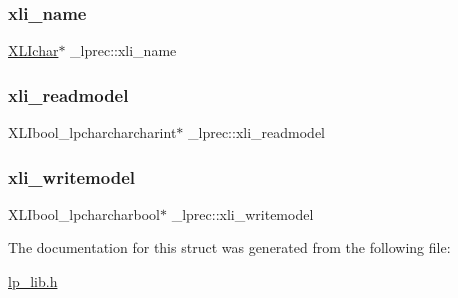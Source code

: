 \mbox{\label{struct__lprec_a9170c25246d72dd3fd3f78f52cd5b1cf}} 
\subsubsection{\texorpdfstring{xli\+\_\+name}{xli\_name}}
{\footnotesize\ttfamily \hyperlink{lp__lib_8h_a44d441822dca4210a8458ba33a1ef89b}{X\+L\+Ichar}$\ast$ \+\_\+lprec\+::xli\+\_\+name}

\mbox{\label{struct__lprec_a87003286e722237e20ef74188878ebf3}} 
\subsubsection{\texorpdfstring{xli\+\_\+readmodel}{xli\_readmodel}}
{\footnotesize\ttfamily X\+L\+Ibool\+\_\+lpcharcharcharint$\ast$ \+\_\+lprec\+::xli\+\_\+readmodel}

\mbox{\label{struct__lprec_ace0253ef27dfeb63e80be0caccca1683}} 
\subsubsection{\texorpdfstring{xli\+\_\+writemodel}{xli\_writemodel}}
{\footnotesize\ttfamily X\+L\+Ibool\+\_\+lpcharcharbool$\ast$ \+\_\+lprec\+::xli\+\_\+writemodel}



The documentation for this struct was generated from the following file\+:\begin{DoxyCompactItemize}
\item 
\hyperlink{lp__lib_8h}{lp\+\_\+lib.\+h}\end{DoxyCompactItemize}
